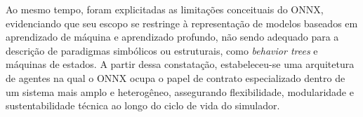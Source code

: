 Ao mesmo tempo, foram explicitadas as limitações conceituais do ONNX, evidenciando que seu escopo se restringe à representação de modelos baseados em aprendizado de máquina e aprendizado profundo, não sendo adequado para a descrição de paradigmas simbólicos ou estruturais, como \emph{behavior trees} e máquinas de estados. A partir dessa constatação, estabeleceu-se uma arquitetura de agentes na qual o ONNX ocupa o papel de contrato especializado dentro de um sistema mais amplo e heterogêneo, assegurando flexibilidade, modularidade e sustentabilidade técnica ao longo do ciclo de vida do simulador.
